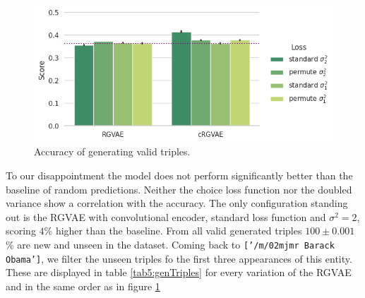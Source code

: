 \begin{figure}[H]
  \centering
  \includegraphics[height=.3\textwidth, keepaspectratio]{graphs/plots/kg_all.png}
  \caption{Accuracy of generating valid triples.}
  \label{fig5:syntax}
\end{figure}

To our disappointment the model does not perform significantly better than the baseline of random predictions. Neither the choice loss function nor the doubled variance show a correlation with the accuracy. The only configuration standing out is the RGVAE with convolutional encoder, standard loss function and $\sigma^2=2$, scoring $4$\% higher than the baseline. From all valid generated triples $100\pm 0.001$\% are new and unseen in the dataset. Coming back to \texttt{['/m/02mjmr Barack Obama']}, we filter the unseen triples fo the first three appearances of this entity. These are displayed in table \ref{tab5:genTriples} for every variation of the RGVAE and in the same order as in figure \ref{fig5:syntax} 



